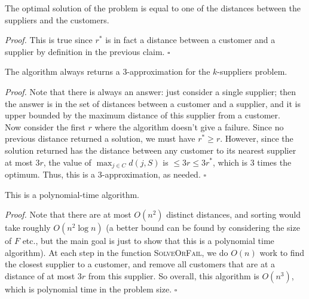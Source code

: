 \documentclass[a4paper]{article}
\newenvironment{proof}{\begin{breakbox}\textit{Proof.}}{\hfill$\square$\end{breakbox}}
\newcommand{\nl}{\vspace{0.2cm}\\}
\begin{document}
\begin{claim}
    The optimal solution of the problem is equal to one of the distances between the suppliers and the customers.
\end{claim}
\begin{proof}
    This is true since $r^*$ is in fact a distance between a customer and a supplier by definition in the previous claim.
\end{proof}
\begin{claim}
    The algorithm always returns a $3$-approximation for the $k$-suppliers problem.
\end{claim}
\begin{proof}
    Note that there is always an answer: just consider a single supplier; then the answer is in the set of distances between a customer and a supplier, and it is upper bounded by the maximum
    distance of this supplier from a customer.\nl
    Now consider the first $r$ where the algorithm doesn't give a failure. Since no previous distance returned a solution, we must have $r^* \ge r$. However, since the solution returned has the
    distance between any customer to its nearest supplier at most $3r$, the value of $\max_{j \in C} d(j, S)$ is $\le 3r \le 3r^*$, which is $3$ times the optimum. Thus, this is a $3$-approximation,
    as needed.
\end{proof}
\begin{claim}
    This is a polynomial-time algorithm.
\end{claim}
\begin{proof}
    Note that there are at most $O(n^2)$ distinct distances, and sorting would take roughly $O(n^2 \log n)$ (a better bound can be found by considering the size of $F$ etc., but the main goal is
    just to show that this is a polynomial time algorithm). At each step in the function \textsc{SolveOrFail}, we do $O(n)$ work to find the closest supplier to a customer, and remove all customers
    that are at a distance of at most $3r$ from this supplier. So overall, this algorithm is $O(n^3)$, which is polynomial time in the problem size.
\end{proof}
\end{document}
